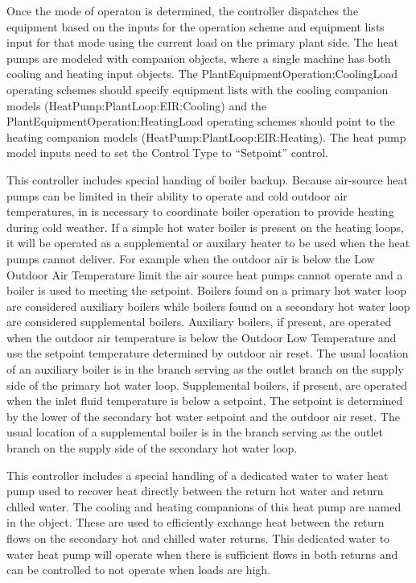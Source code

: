 Once the mode of operaton is determined, the controller dispatches the equipment based on the inputs for the operation scheme and equipment lists input for that mode using the current load on the primary plant side.  The heat pumps are modeled with companion objects, where a single machine has both cooling and heating input objects.  The PlantEquipmentOperation:CoolingLoad operating schemes should specify equipment lists with the cooling companion models (HeatPump:PlantLoop:EIR:Cooling) and the PlantEquipmentOperation:HeatingLoad operating schemes should point to the heating companion models (HeatPump:PlantLoop:EIR:Heating).  The heat pump model inputs need to set the Control Type to ``Setpoint'' control. 

This controller includes special handing of boiler backup.  Because air-source heat pumps can be limited in their ability to operate and cold outdoor air temperatures, in is necessary to coordinate boiler operation to provide heating during cold weather.  If a simple hot water boiler is present on the heating loops, it will be operated as a supplemental or auxilary heater to be used when the heat pumps cannot deliver.  For example when the outdoor air is below the Low Outdoor Air Temperature limit the air source heat pumps cannot operate and a boiler is used to meeting the setpoint.  Boilers found on a primary hot water loop are considered auxiliary boilers while boilers found on a secondary hot water loop are considered supplemental boilers.  Auxiliary boilers, if present, are operated when the outdoor air temperature is below the Outdoor Low Temperature and use the setpoint temperature determined by outdoor air reset.  The usual location of an auxiliary boiler is in the branch serving as the outlet branch on the supply side of the primary hot water loop.  Supplemental boilers, if present, are operated when the inlet fluid temperature is below a setpoint.  The setpoint is determined by the lower of the secondary hot water setpoint and the outdoor air reset.  The usual location of a supplemental boiler is in the branch serving as the outlet branch on the supply side of the secondary hot water loop.

This controller includes a special handling of a dedicated water to water heat pump used to recover heat directly between the return hot water and return chlled water.  The cooling and heating companions of this heat pump are named in the object.  These are used to efficiently exchange heat between the return flows on the secondary hot and chilled water returns.  This dedicated water to water heat pump will operate when there is sufficient flows in both returns and can be controlled to not operate when loads are high.  

